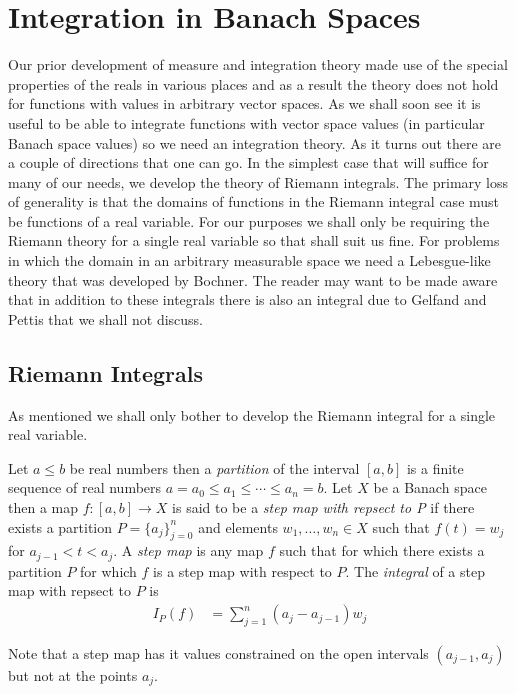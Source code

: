 \section{Integration in Banach Spaces}

Our prior development of measure and integration theory made use of the
special properties of the reals in various places and as a
result the theory does not hold for functions with values in arbitrary
vector spaces.  As we shall soon see it is useful to be able to
integrate functions with vector space values (in particular Banach
space values) so we need an integration theory.  As it turns out there are a
couple of directions that one can go.  In the simplest case that will
suffice for many of our needs, we develop the theory of Riemann
integrals.  The primary loss of generality is
that the domains of functions in the Riemann integral case must be 
functions of a real variable.  For our purposes we shall only be
requiring the Riemann theory for a single real variable so that shall
suit us fine.  For problems in which the domain in an arbitrary
measurable space we need a Lebesgue-like theory that was developed by
Bochner.  The reader may want to be made aware that in addition to these integrals there is also an
integral due to Gelfand and Pettis that we shall not discuss.

\subsection{Riemann Integrals}
As mentioned we shall only bother to develop the Riemann integral for
a single real variable.
\begin{defn}Let $a \leq b$ be real numbers then a \emph{partition} of
  the interval $[a,b]$ is a finite sequence of real numbers $a=a_0
  \leq a_1 \leq \dotsb \leq a_n = b$.  Let $X$ be a Banach space then
  a map $f : [a,b] \to X$ is said to be a \emph{step map with repsect
    to P} if there
  exists a partition $P=\lbrace a_j \rbrace_{j=0}^n$ and elements $w_1,
  \dotsc, w_n \in X$ such that $f(t) = w_j$ for $a_{j-1} < t < a_j$.
  A \emph{step map} is any map $f$ such that for which there exists a partition
  $P$ for which $f$ is a step map with respect to $P$.
  The \emph{integral} of a step map with repsect to $P$ is
\begin{align*}
I_P(f) &= 
\sum_{j=1}^n (a_j - a_{j-1}) w_j
\end{align*}
\end{defn}
Note that a step map has it values constrained on the open intervals
$(a_{j-1},a_j)$ but not at the points $a_j$.

